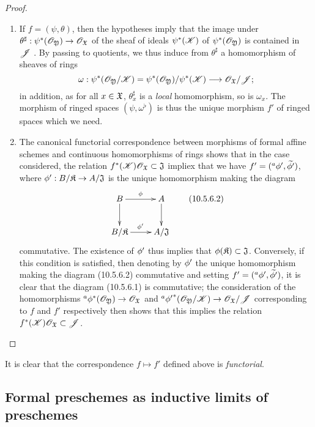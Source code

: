 \begin{proof}
\label{proof-1.10.5.6}
\medskip\noindent
\begin{enumerate}[label=(\roman*)]
  \item If $f=(\psi,\theta)$, then the hypotheses imply that the image under $\theta^\sharp:\psi^*(\OO_\fk{Y})\to\OO_\fk{X}$ of the sheaf of ideals $\psi^*(\mathscr{K})$ of $\psi^*(\mathscr{O}_\mathfrak{Y})$ is contained in $\mathscr{J}$ .
    By passing to quotients, we thus induce from $\theta^\sharp$ a homomorphism of sheaves of rings
    \[
      \omega:\psi^*(\OO_\fk{Y}/\sh{K})=\psi^*(\OO_\fk{Y})/\psi^*(\sh{K})\to\OO_\fk{X}/\sh{J};
    \]
    in addition, as for all $x\in\mathfrak{X}$, $\theta_x^\sharp$ is a \emph{local} homomorphism, so is $\omega_x$.
    The morphism of ringed spaces $(\psi,\omega^\flat)$ is thus  the unique morphism $f'$ of ringed spaces which we need.
  \item The canonical functorial correspondence between morphisms of formal affine schemes and continuous homomorphisms of rings  shows that in the case considered, the relation $f^*(\mathscr{K})\mathscr{O}_\mathfrak{X}\subset\mathfrak{J}$ impliex that we have $f'=({}^a\phi',\widetilde{\phi'})$, where $\vphi':B/\fk{K}\to A/\fk{J}$ is the unique homomorphism making the diagram
    \[
      \xymatrix{
        B\ar[r]^\vphi\ar[d] &
        A\ar[d]\\
        B/\fk{K}\ar[r]^{\vphi'} &
        A/\fk{J}
      }
      \tag{10.5.6.2}
    \]
    commutative.
    The existence of $\phi'$ thus implies that $\phi(\mathfrak{K})\subset\mathfrak{J}$.
    Conversely, if this condition is satisfied, then denoting by $\phi'$ the unique homomorphism making the diagram (10.5.6.2) commutative and setting $f'=({}^a\phi',\widetilde{\phi'})$, it is clear that the diagram (10.5.6.1) is commutative; the consideration of the homomorphisms ${}^a\vphi^*(\OO_\fk{Y})\to\OO_\fk{X}$ and ${}^a{\vphi'}^*(\OO_\fk{Y}/\sh{K})\to\OO_\fk{X}/\sh{J}$ corresponding to $f$ and $f'$ respectively then shows that this implies the relation $f^*(\mathscr{K})\mathscr{O}_\mathfrak{X}\subset\mathscr{J}$.
\end{enumerate}
\end{proof}

It is clear that the correspondence $f\mapsto f'$ defined above is \emph{functorial}.

\subsection{Formal preschemes as inductive limits of preschemes}
\label{subsection-formal-preschemes-as-inductive-limits}

